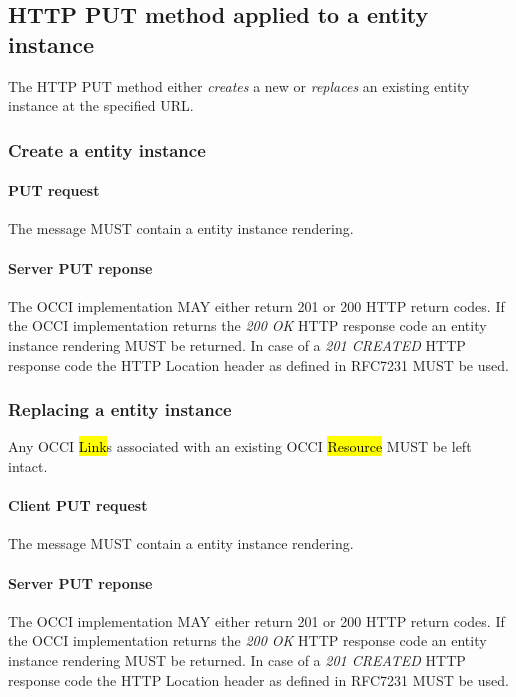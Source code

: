 \documentclass[10pt,a4paper]{article}
\begin{document}
\subsection{HTTP PUT method applied to a entity instance}
The HTTP PUT method either {\em creates} a new or {\em replaces} an existing entity instance at the specified URL.

\subsubsection{Create a entity instance}

\paragraph{PUT request}
The message MUST contain a entity instance rendering.

\paragraph{Server PUT reponse}
The OCCI implementation MAY either return 201 or 200 HTTP return codes. If the OCCI implementation
returns the \emph{200 OK} HTTP response code an entity instance rendering MUST be returned.
In case of a \emph{201 CREATED} HTTP response code the HTTP Location header as defined in RFC7231 \cite{rfc7231} MUST be used.

\subsubsection{Replacing a entity instance}
Any OCCI \hl{Link}s associated with an existing OCCI \hl{Resource} MUST be left intact.

\paragraph{Client PUT request}
The message MUST contain a entity instance rendering.

\paragraph{Server PUT reponse}
The OCCI implementation MAY either return 201 or 200 HTTP return codes.  If the OCCI implementation
returns the \emph{200 OK} HTTP response code an entity instance rendering MUST be returned.
In case of a \emph{201 CREATED} HTTP response code the HTTP Location header as defined in RFC7231 \cite{rfc7231} MUST be used.
\end{document}
